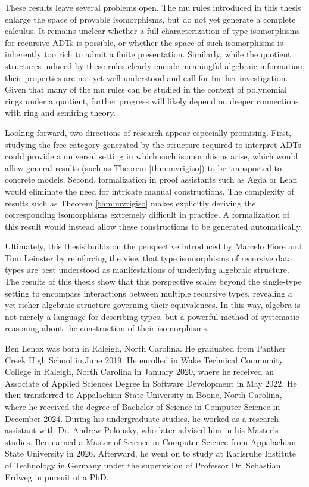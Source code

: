 \documentclass{msthesis}
\theoremstyle{definition}
\begin{document}
These results leave several problems open.  The mu rules introduced in this thesis enlarge the space of provable isomorphisms, but do not yet generate a complete calculus.  It remains unclear whether a full characterization of type isomorphisms for recursive ADTs is possible, or whether the space of such isomorphisms is inherently too rich to admit a finite presentation.  Similarly, while the quotient structures induced by these rules clearly encode meaningful algebraic information, their properties are not yet well understood and call for further investigation.  Given that many of the mu rules can be studied in the context of polynomial rings under a quotient, further progress will likely depend on deeper connections with ring and semiring theory.

Looking forward, two directions of research appear especially promising.  First, studying the free category generated by the structure required to interpret ADTs could provide a universal setting in which such isomorphisms arise, which would allow general results (such as Theorem \ref{thm:mvrigiso}) to be transported to concrete models.  Second, formalization in proof assistants such as Agda or Lean would eliminate the need for intricate manual constructions.  The complexity of results such as Theorem \ref{thm:mvrigiso} makes explicitly deriving the corresponding isomorphisms extremely difficult in practice.  A formalization of this result would instead allow these constructions to be generated automatically.

Ultimately, this thesis builds on the perspective introduced by Marcelo Fiore and Tom Leinster by reinforcing the view that type isomorphisms of recursive data types are best understood as manifestations of underlying algebraic structure.  The results of this thesis show that this perspective scales beyond the single-type setting to encompass interactions between multiple recursive types, revealing a yet richer algebraic structure governing their equivalences.  In this way, algebra is not merely a language for describing types, but a powerful method of systematic reasoning about the construction of their isomorphisms.



\begin{vita}
Ben Lenox was born in Raleigh, North Carolina.  He graduated from Panther Creek High School in June 2019.  He enrolled in Wake Technical Community College in Raleigh, North Carolina in January 2020, where he received an Associate of Applied Sciences Degree in Software Development in May 2022.  He then transferred to Appalachian State University in Boone, North Carolina, where he received the degree of Bachelor of Science in Computer Science in December 2024.  During his undergraduate studies, he worked as a research assistant with Dr. Andrew Polonsky, who later advised him in his Master's studies.  Ben earned a Master of Science in Computer Science from Appalachian State University in 2026.  Afterward, he went on to study at Karlsruhe Institute of Technology in Germany under the supervision of Professor Dr. Sebastian Erdweg in pursuit of a PhD.
\end{vita}
\end{document}
